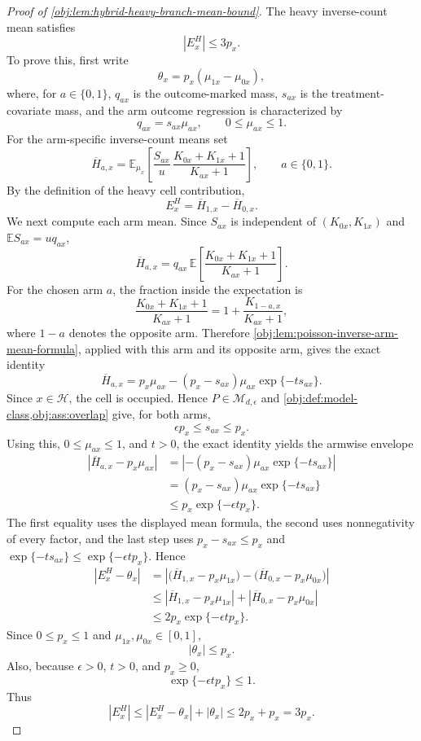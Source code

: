 \documentclass[11pt]{article}
\begin{document}
\begin{proof}[Proof of \cref{obj:lem:hybrid-heavy-branch-mean-bound}]
The heavy inverse-count mean satisfies
\[
|E^H_x|\le 3p_x .
\]
To prove this, first write
\[
\theta_x=p_x(\mu_{1x}-\mu_{0x}),
\]
where, for \(a\in\{0,1\}\), \(q_{ax}\) is the outcome-marked mass, \(s_{ax}\) is the treatment-covariate mass, and the arm outcome regression is characterized by
\[
q_{ax}=s_{ax}\mu_{ax},\qquad 0\le \mu_{ax}\le 1 .
\]
For the arm-specific inverse-count means set
\[
\overline H_{a,x}
=
\mathbb E_{\mu_x}\!\left[
\frac{S_{ax}}{u}\,
\frac{K_{0x}+K_{1x}+1}{K_{ax}+1}
\right],\qquad a\in\{0,1\}.
\]
By the definition of the heavy cell contribution,
\[
E^H_x=\overline H_{1,x}-\overline H_{0,x}.
\]
We next compute each arm mean. Since \(S_{ax}\) is independent of \((K_{0x},K_{1x})\) and \(\mathbb E S_{ax}=u q_{ax}\),
\[
\overline H_{a,x}
=
q_{ax}\,
\mathbb E\!\left[\frac{K_{0x}+K_{1x}+1}{K_{ax}+1}\right].
\]
For the chosen arm \(a\), the fraction inside the expectation is
\[
\frac{K_{0x}+K_{1x}+1}{K_{ax}+1}
=
1+\frac{K_{1-a,x}}{K_{ax}+1},
\]
where \(1-a\) denotes the opposite arm. Therefore \cref{obj:lem:poisson-inverse-arm-mean-formula}, applied with this arm and its opposite arm, gives the exact identity
\[
\overline H_{a,x}
=
 p_x\mu_{ax}-(p_x-s_{ax})\mu_{ax}\exp\{-t s_{ax}\}.
\]
Since \(x\in\mathcal H\), the cell is occupied. Hence \(P\in\mathcal M_{d,\epsilon}\) and \cref{obj:def:model-class,obj:ass:overlap} give, for both arms,
\[
\epsilon p_x\le s_{ax}\le p_x .
\]
Using this, \(0\le\mu_{ax}\le1\), and \(t>0\), the exact identity yields the armwise envelope
\[
\begin{aligned}
|\overline H_{a,x}-p_x\mu_{ax}|
&=\left|-(p_x-s_{ax})\mu_{ax}\exp\{-t s_{ax}\}\right|\\
&=(p_x-s_{ax})\mu_{ax}\exp\{-t s_{ax}\}\\
&\le p_x\exp\{-\epsilon t p_x\}.
\end{aligned}
\]
The first equality uses the displayed mean formula, the second uses nonnegativity of every factor, and the last step uses \(p_x-s_{ax}\le p_x\) and \(\exp\{-t s_{ax}\}\le\exp\{-\epsilon t p_x\}\). Hence
\[
\begin{aligned}
|E^H_x-\theta_x|
&=\left|\bigl(\overline H_{1,x}-p_x\mu_{1x}\bigr)
      -\bigl(\overline H_{0,x}-p_x\mu_{0x}\bigr)\right|\\
&\le |\overline H_{1,x}-p_x\mu_{1x}|
   + |\overline H_{0,x}-p_x\mu_{0x}|\\
&\le 2p_x\exp\{-\epsilon t p_x\}.
\end{aligned}
\]
Since \(0\le p_x\le1\) and \(\mu_{1x},\mu_{0x}\in[0,1]\),
\[
|\theta_x|\le p_x .
\]
Also, because \(\epsilon>0\), \(t>0\), and \(p_x\ge0\),
\[
\exp\{-\epsilon t p_x\}\le1.
\]
Thus
\[
|E^H_x|
\le |E^H_x-\theta_x|+|\theta_x|
\le 2p_x+p_x
=3p_x .
\]


\end{proof}
\end{document}

